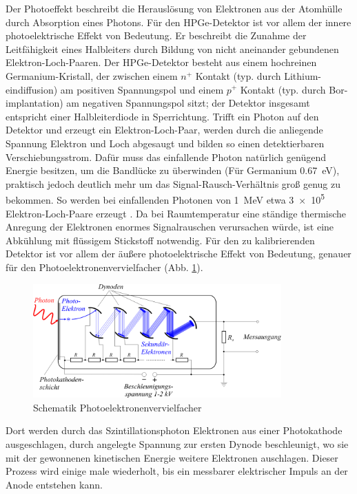 Der Photoeffekt beschreibt die Herauslösung von Elektronen aus der Atomhülle durch Absorption eines Photons.
Für den HPGe-Detektor ist vor allem der innere photoelektrische Effekt von Bedeutung. Er beschreibt die Zunahme der Leitfähigkeit eines Halbleiters durch Bildung von nicht aneinander gebundenen Elektron-Loch-Paaren. Der HPGe-Detektor besteht aus einem hochreinen Germanium-Kristall, der zwischen einem $n^{+}$ Kontakt (typ. durch Lithium-eindiffusion) am positiven Spannungspol und einem $p^{+}$ Kontakt (typ. durch Bor-implantation) am negativen Spannungspol sitzt; der Detektor insgesamt entspricht einer Halbleiterdiode in Sperrichtung. Trifft ein Photon auf den Detektor und erzeugt ein Elektron-Loch-Paar, werden durch die anliegende Spannung Elektron und Loch abgesaugt und bilden so einen detektierbaren Verschiebungsstrom. Dafür muss das einfallende Photon natürlich genügend Energie besitzen, um die Bandlücke zu überwinden (Für Germanium \SI{0.67}{\electronvolt}), praktisch jedoch deutlich mehr um das Signal-Rausch-Verhältnis groß genug zu bekommen. So werden bei einfallenden Photonen von \SI{1}{\mega\electronvolt} etwa \num{3e5} Elektron-Loch-Paare erzeugt \cite{HPGe-Detektor}. Da bei Raumtemperatur eine ständige thermische Anregung der Elektronen enormes Signalrauschen verursachen würde, ist eine Abkühlung mit flüssigem Stickstoff notwendig.
Für den zu kalibrierenden Detektor ist vor allem der äußere photoelektrische Effekt von Bedeutung, genauer für den Photoelektronenvervielfacher (Abb. \ref{theorie_PEV}).

\begin{figure}[ht]
	\centering
    \includegraphics[width=0.85\textwidth]{images/Photomultiplier_schema_de.png}
	\caption{Schematik Photoelektronenvervielfacher \cite{Bild_Photomultiplier}}
	\label{theorie_PEV}
\end{figure}

Dort werden durch das Szintillationsphoton Elektronen aus einer Photokathode ausgeschlagen, durch angelegte Spannung zur ersten Dynode beschleunigt, wo sie mit der gewonnenen kinetischen Energie weitere Elektronen auschlagen. Dieser Prozess wird einige male wiederholt, bis ein messbarer elektrischer Impuls an der Anode entstehen kann.

